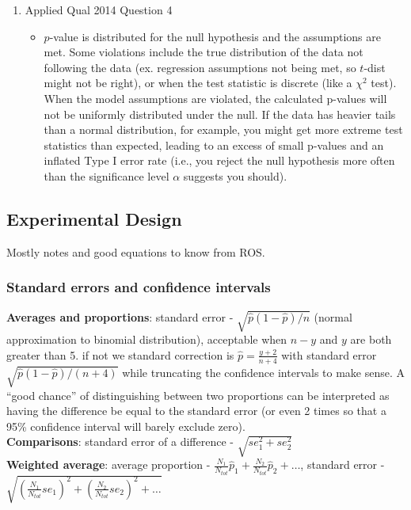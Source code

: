 \documentclass{article}
\begin{document}
\begin{itemize}
\begin{enumerate}[label=(\alph*)]
    \item Applied Qual 2014 Question 4
      \begin{itemize}
        \item $p$-value is distributed for the null hypothesis and the assumptions are met. Some violations include the true distribution of the data not following the data (ex. regression assumptions not being met, so $t$-dist might not be right), or when the test statistic is discrete (like a $\chi^2$ test). When the model assumptions are violated, the calculated p-values will not be uniformly distributed under the null. If the data has heavier tails than a normal distribution, for example, you might get more extreme test statistics than expected, leading to an excess of small p-values and an inflated Type I error rate (i.e., you reject the null hypothesis more often than the significance level $\alpha$ suggests you should).
      \end{itemize}
  \end{enumerate}

\end{itemize}

\subsection{Experimental Design}
Mostly notes and good equations to know from ROS.

\subsubsection{Standard errors and confidence intervals}
\textbf{Averages and proportions}: standard error - $\sqrt{\hat{p}(1-\hat{p})/n}$ (normal approximation to binomial distribution), acceptable when $n - y$ and $y$ are both greater than 5.
if not we standard correction is $\hat{p} = \frac{y + 2}{n+4}$ with standard error $\sqrt{\hat{p}(1 - \hat{p})/(n+4)}$ while truncating the confidence intervals to make sense.
A ``good chance'' of distinguishing between two proportions can be interpreted as having the difference be equal to the standard error (or even 2 times so that a 95\% confidence interval will barely exclude zero).
\\

\textbf{Comparisons}: standard error of a difference - $\sqrt{se_1^2 + se_2^2}$ \\

\textbf{Weighted average}: average proportion - $\frac{N_1}{N_{tot}}\hat{p}_1 + \frac{N_2}{N_{tot}}\hat{p}_2 + \ldots$, standard error - $\sqrt{(\frac{N_1}{N_{tot}} se_1)^2 + (\frac{N_2}{N_{tot}}se_2)^2 + \ldots}$\\
\end{document}
